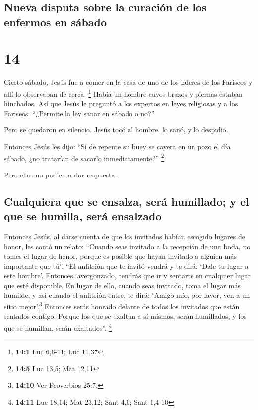 \hypertarget{nueva-disputa-sobre-la-curaciuxf3n-de-los-enfermos-en-suxe1bado}{%
\subsection{Nueva disputa sobre la curación de los enfermos en
sábado}\label{nueva-disputa-sobre-la-curaciuxf3n-de-los-enfermos-en-suxe1bado}}

\hypertarget{section-13}{%
\section{14}\label{section-13}}

 Cierto sábado, Jesús fue a comer en la casa de uno de los
líderes de los Fariseos y allí lo observaban de cerca. \footnote{\textbf{14:1}
  Luc 6,6-11; Luc 11,37}  Había un hombre cuyos brazos y
piernas estaban hinchados.  Así que Jesús le preguntó a
los expertos en leyes religiosas y a los Fariseos: ``¿Permite la ley
sanar en sábado o no?''

 Pero se quedaron en silencio. Jesús tocó al hombre, lo
sanó, y lo despidió.

 Entonces Jesús les dijo: ``Si de repente su buey se
cayera en un pozo el día sábado, ¿no tratarían de sacarlo
inmediatamente?'' \footnote{\textbf{14:5} Luc 13,5; Mat 12,11}

 Pero ellos no pudieron dar respuesta.

\hypertarget{cualquiera-que-se-ensalza-seruxe1-humillado-y-el-que-se-humilla-seruxe1-ensalzado}{%
\subsection{Cualquiera que se ensalza, será humillado; y el que se
humilla, será
ensalzado}\label{cualquiera-que-se-ensalza-seruxe1-humillado-y-el-que-se-humilla-seruxe1-ensalzado}}

 Entonces Jesús, al darse cuenta de que los invitados
habían escogido lugares de honor, les contó un relato: 
``Cuando seas invitado a la recepción de una boda, no tomes el lugar de
honor, porque es posible que hayan invitado a alguien más importante que
tú''.  ``El anfitrión que te invitó vendrá y te dirá:
`Dale tu lugar a este hombre'. Entonces, avergonzado, tendrás que ir y
sentarte en cualquier lugar que esté disponible.  En
lugar de ello, cuando seas invitado, toma el lugar más humilde, y así
cuando el anfitrión entre, te dirá: `Amigo mío, por favor, ven a un
sitio mejor'.\footnote{\textbf{14:10} Ver Proverbios 25:7.} Entonces
serás honrado delante de todos los invitados que están sentados contigo.
 Porque los que se exaltan a sí mismos, serán humillados,
y los que se humillan, serán exaltados''. \footnote{\textbf{14:11} Luc
  18,14; Mat 23,12; Sant 4,6; Sant 1,4-10}

